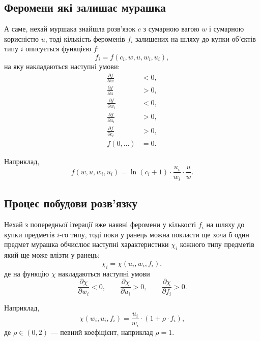 \documentclass[a4paper, 12pt]{article}
\numberwithin{equation}{section}
\begin{document}
\subsection{Феромени які залишає мурашка}

А саме, нехай муршака знайшла розв'язок $c$ з сумарною вагою $w$ і сумарною корисністю $u$, тоді кількість фероменів $f_i$ залишених на шляху до купки об'єктів типу $i$ описується функцією $f$:
\begin{equation}
    f_i = f(c_i, w, u, w_i, u_i),
\end{equation}
на яку накладаються наступні умови:
\begin{align}
    \frac{\partial f}{\partial w} &< 0, \\
    \frac{\partial f}{\partial u} &> 0, \\
    \frac{\partial f}{\partial w_i} &< 0, \\
    \frac{\partial f}{\partial u_i} &> 0, \\
    \frac{\partial f}{\partial c_i} &> 0, \\
    f(0, \ldots) &= 0.
\end{align}

Наприклад, 
\begin{equation}
    f(w, u, w_i, u_i) = \ln (c_i + 1) \cdot \frac{u_i}{w_i} \cdot \frac{u}{w}.
\end{equation}

\subsection{Процес побудови розв'язку}

Нехай з попередньої ітерації вже наявні феромени у кількості $f_i$ на шляху до купки предметів $i$-го типу, тоді поки у ранець можна покласти ще хоча б один предмет мурашка обчислює наступні характеристики $\chi_i$ кожного типу предметів який ще може влізти у ранець:
\begin{equation}
    \chi_i = \chi(u_i, w_i, f_i),
\end{equation}
де на функцію $\chi$ накладаються наступні умови
\begin{equation}
    \frac{\partial \chi}{\partial w_i} < 0, \qquad
    \frac{\partial \chi}{\partial u_i} > 0, \qquad
    \frac{\partial \chi}{\partial f_i} > 0.
\end{equation}

Наприклад,
\begin{equation}
    \chi(w_i, u_i, f_i) = \frac{u_i}{w_i} \cdot (1 + \rho \cdot f_i),
\end{equation}
де $\rho \in (0, 2)$ --- певний коефіцієнт, наприклад $\rho = 1$. \medskip
\end{document}
